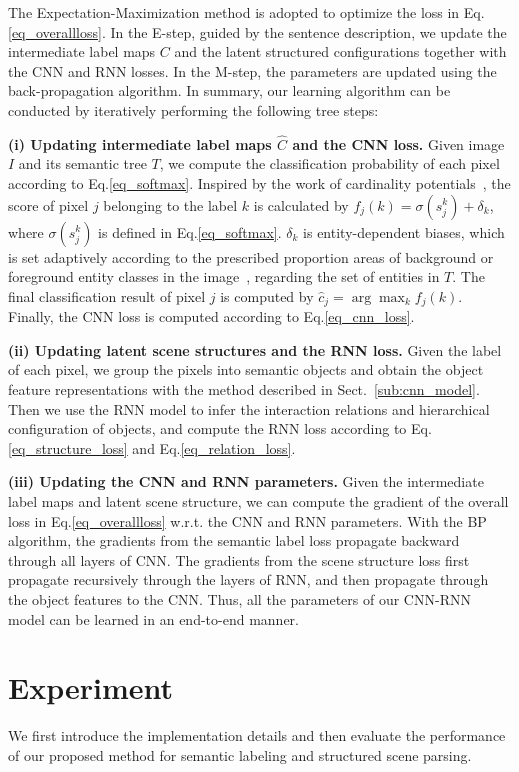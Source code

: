 \documentclass[10pt,twocolumn,letterpaper]{article}
\begin{document}
The Expectation-Maximization method is adopted to optimize the loss in Eq.\eqref{eq_overallloss}. In the E-step, guided by the sentence description, we update the intermediate label maps $C$ and the latent structured configurations together with the CNN and RNN losses. In the M-step, the parameters are updated using the back-propagation algorithm. In summary, our learning algorithm can be conducted by iteratively performing the following tree steps:


\textbf{(i) Updating intermediate label maps $\hat{C}$ and the CNN loss.} Given image $I$ and its semantic tree $T$, we compute the classification probability of each pixel according to Eq.\eqref{eq_softmax}. Inspired by the work of cardinality potentials~\cite{DBLP:conf/uai/TarlowSZAF12}\cite{DBLP:conf/icml/LiZ14}, the score of pixel $j$ belonging to the label $k$ is calculated by $f_j(k) = \sigma(s_j^k)+\delta_k$, where $\sigma(s_j^k)$ is defined in Eq.\eqref{eq_softmax}. $\delta_k$ is entity-dependent biases, which is set adaptively according to the prescribed proportion areas of background or foreground entity classes in the image~\cite{DBLP:WeaklySegmentation}, regarding the set of entities in $T$. The final classification result of pixel $j$ is computed by $\widehat{c}_j=\arg\max_k f_j(k)$. Finally, the CNN loss is computed according to Eq.\eqref{eq_cnn_loss}.


\textbf{(ii) Updating latent scene structures and the RNN loss.} Given the label of each pixel, we group the pixels into semantic objects and obtain the object feature representations with the method described in Sect.~\ref{sub:cnn_model}. Then we use the RNN model to infer the interaction relations and hierarchical configuration of objects, and compute the RNN loss according to Eq.\eqref{eq_structure_loss} and Eq.\eqref{eq_relation_loss}.

\textbf{(iii) Updating the CNN and RNN parameters.}  Given the intermediate label maps and latent scene structure, we can compute the gradient of the overall loss in Eq.\eqref{eq_overallloss} w.r.t. the CNN and RNN parameters. With the BP algorithm, the gradients from the semantic label loss propagate backward through all layers of CNN. The gradients from the scene structure loss first propagate recursively through the layers of RNN, and then propagate through the object features to the CNN. Thus, all the parameters of our CNN-RNN model can be learned in an end-to-end manner.



\section{Experiment}
\label{sec:experiments}
We first introduce the implementation details and then evaluate the performance of our proposed method for semantic labeling and structured scene parsing.
\end{document}

